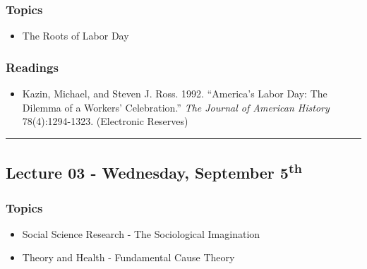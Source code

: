 \documentclass[]{book}
\providecommand{\tightlist}{%
  \setlength{\itemsep}{0pt}\setlength{\parskip}{0pt}}
\theoremstyle{definition}
\theoremstyle{definition}
\theoremstyle{definition}
\theoremstyle{remark}
\begin{document}
\hypertarget{topics-2}{%
\subsubsection*{Topics}\label{topics-2}}

\begin{itemize}
\tightlist
\item
  The Roots of Labor Day
\end{itemize}

\hypertarget{readings-2}{%
\subsubsection*{Readings}\label{readings-2}}

\begin{itemize}
\tightlist
\item
  Kazin, Michael, and Steven J. Ross. 1992. ``America's Labor Day: The
  Dilemma of a Workers' Celebration.'' \emph{The Journal of American
  History} 78(4):1294-1323. (Electronic Reserves)
\end{itemize}

\begin{center}\rule{0.5\linewidth}{\linethickness}\end{center}

\hypertarget{lecture-03---wednesday-september-5th}{%
\subsection*{\texorpdfstring{Lecture 03 - Wednesday, September
5\textsuperscript{th}}{Lecture 03 - Wednesday, September 5th}}\label{lecture-03---wednesday-september-5th}}

\hypertarget{topics-3}{%
\subsubsection*{Topics}\label{topics-3}}

\begin{itemize}
\tightlist
\item
  Social Science Research - The Sociological Imagination
\item
  Theory and Health - Fundamental Cause Theory
\end{itemize}
\end{document}
